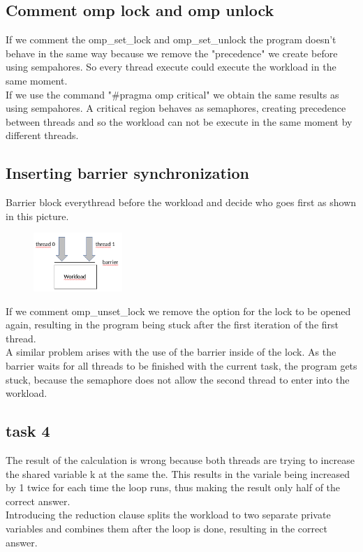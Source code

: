 \documentclass[11pt,a4paper]{article}
\begin{document}
\subsection{Comment omp lock and omp unlock}
If we comment the omp\_set\_lock and omp\_set\_unlock the program doesn't behave in the same way because we remove the "precedence" we create before using sempahores. So every thread execute could execute the workload in the same moment. \\
If we use the command "\#pragma omp critical" we obtain the same results as using sempahores. A critical region behaves as semaphores, creating precedence between threads and so the workload can not be execute in the same moment by different threads. 
\subsection{Inserting barrier synchronization}
Barrier block everythread before the workload and decide who goes first as shown in this picture.
\begin{figure}[h]
\centering
\includegraphics[width=0.3\textwidth]{foto/barrier.png}
\end{figure}
If we comment omp\_unset\_lock we remove the option for the lock to be opened again, resulting in the program being stuck after the first iteration of the first thread. \\
A similar problem arises with the use of the barrier inside of the lock. As the barrier waits for all threads to be finished with the current task, the program gets stuck, because the semaphore does not allow the second thread to enter into the workload.
\subsection{task 4}
The result of the calculation is wrong because both threads are trying to increase the shared variable k at the same the. This results in the variale being increased by 1 twice for each time the loop runs, thus making the result only half of the correct answer. \\
Introducing the reduction clause splits the workload to two separate private variables and combines them after the loop is done, resulting in the correct answer.
\end{document}
